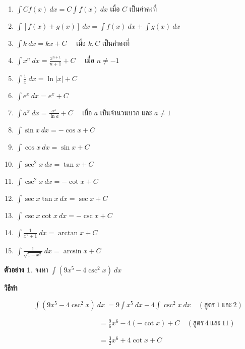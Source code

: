 \documentclass[
]{book}
\theoremstyle{definition}
\theoremstyle{definition}
\newtheorem{example}{ตัวอย่าง}[chapter]
\theoremstyle{definition}
\theoremstyle{definition}
\theoremstyle{remark}
\begin{document}
\begin{enumerate}
\def\labelenumi{\arabic{enumi}.}
\item
  \(\displaystyle \int C f(x) \ dx = C \int f(x) \ dx\) เมื่อ \(C\) เป็นค่าคงที่
\item
  \(\displaystyle \int [f(x)+g(x)] \ dx = \int f(x) \ dx+\int
  g(x) \ dx\)
\item
  \(\displaystyle \int k \ dx = kx+C \quad\) เมื่อ \(k, C\) เป็นค่าคงที่
\item
  \(\displaystyle \int x^{n} \ dx = \frac{x^{n+1}}{n+1}+C
  \quad\) เมื่อ \(n\neq -1\)
\item
  \(\displaystyle \int \frac{1}{x} \ dx = \ln|x|+C\)
\item
  \(\displaystyle \int e^{x} \ dx = e^{x}+C\)
\item
  \(\displaystyle \int a^{x} \ dx = \frac{a^{x}}{ \ln a}+C
  \quad\) เมื่อ \(a\) เป็นจำนวนบวก และ \(a\neq 1\)
\item
  \(\displaystyle \int \sin x \ dx = -\cos x+C\)
\item
  \(\displaystyle \int \cos x \ dx = \sin x+C\)
\item
  \(\displaystyle \int \sec^{2} x \ dx = \tan x+C\)
\item
  \(\displaystyle \int \csc^{2} x \ dx = -\cot x+C\)
\item
  \(\displaystyle \int \sec x \tan x \ dx = \sec x+C\)
\item
  \(\displaystyle \int \csc x \cot x \ dx = -\csc x+C\)
\item
  \(\displaystyle \int \frac{1}{x^{2}+1} \ dx = \arctan x+C\)
\item
  \(\displaystyle \int \frac{1}{\sqrt{1-x^{2}}} \ dx =
  \arcsin x+C\)
\end{enumerate}

\begin{example}
จงหา \(\displaystyle \int (9x^{5}-4 \csc^{2} x) \ dx\)
\end{example}

\textbf{วิธีทำ}

\(\qquad \qquad \ \displaystyle \int (9x^{5}-4 \csc^{2} x) \ dx \ = 9\int
x^{5} \ dx -4 \int \csc^{2} x \ dx \quad ( \mbox{สูตร} \ 1 \ \mbox{และ} \ 
2)\)

\(\qquad \qquad \qquad \qquad \qquad \qquad \quad \ \ =\displaystyle
\frac{9}{ 6}x^{6} -4(-\cot x)+C \quad ( \mbox{สูตร} \ 4 \ \mbox{และ} \ 11)\)

\(\qquad \qquad \qquad \qquad \qquad \qquad \quad \ \ =\displaystyle
\frac{3}{2}x^{6}+4\cot x+C\)
\end{document}
